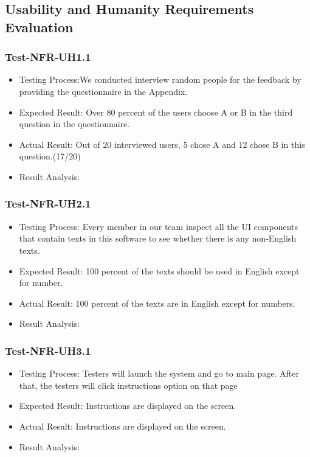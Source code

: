 \documentclass[12pt, titlepage]{article}
\begin{document}
\subsection{Usability and Humanity Requirements Evaluation}
            \subsubsection{Test-NFR-UH1.1}
\begin{itemize}
    \item Testing Process:We conducted interview random people for the feedback by providing the questionnaire in the Appendix.
    \item Expected Result: Over 80 percent of the users choose A or B in the third question in the questionnaire.
    \item Actual Result: Out of 20 interviewed users, 5 chose A and 12 chose B in this question.(17/20)
    \item Result Analysis: \pass
\end{itemize}

            \subsubsection{Test-NFR-UH2.1}
\begin{itemize}
    \item Testing Process: Every member in our team inspect all the UI components that contain texts in this software to see whether there is any non-English texts.
    \item Expected Result: 100 percent of the texts should be used in English except for number.
    \item Actual Result: 100 percent of the texts are in English except for numbers.
    \item Result Analysis: \pass
\end{itemize}

            \subsubsection{Test-NFR-UH3.1}
\begin{itemize}
    \item Testing Process: Testers will launch the system and go to main page. After that, the testers will click instructions option on that page
    \item Expected Result: Instructions are displayed on the screen.
    \item Actual Result: Instructions are displayed on the screen.
    \item Result Analysis: \pass
\end{itemize}
\end{document}
